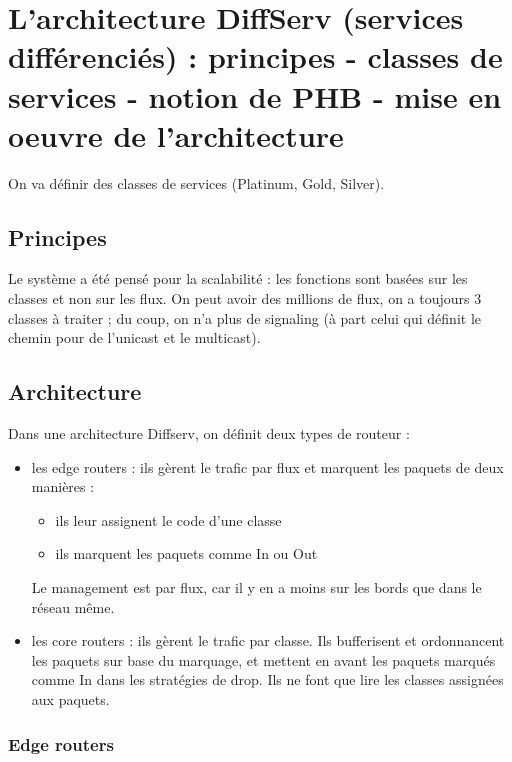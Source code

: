 \chapter{L'architecture DiffServ (services différenciés) : principes - classes de services - notion de PHB - mise en oeuvre de l'architecture}

On va définir des classes de services (Platinum, Gold, Silver).
		
		\section{Principes}
		Le système a été pensé pour la scalabilité : les fonctions sont basées sur les classes et non sur les flux. On peut avoir des millions de flux, on a toujours 3 classes à traiter ; du coup, on n'a plus de signaling (à part celui qui définit le chemin pour de l'unicast et le multicast).
		
		\section{Architecture}
		
		Dans une architecture Diffserv, on définit deux types de routeur :
		
		\begin{itemize}
			\item les edge routers : ils gèrent le trafic par flux et marquent les paquets de deux manières :
			
			\begin{itemize}
				\item ils leur assignent le code d'une classe
				\item ils marquent les paquets comme In ou Out
			\end{itemize}
			
			Le management est par flux, car il y en a moins sur les bords que dans le réseau même.
			
			\item les core routers : ils gèrent le trafic par classe. Ils bufferisent et ordonnancent les paquets sur base du marquage, et mettent en avant les paquets marqués comme In dans les stratégies de drop. Ils ne font que lire les classes assignées aux paquets.
		\end{itemize}
		
			\subsection{Edge routers}
			
